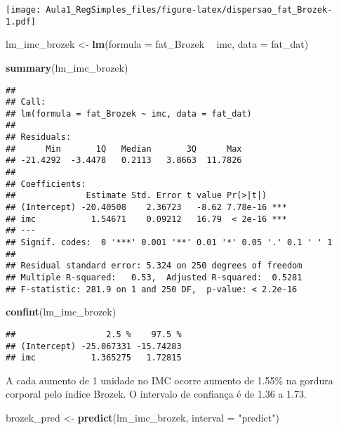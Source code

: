 \documentclass[]{article}
\newenvironment{Shaded}{\begin{snugshade}}{\end{snugshade}}
\newcommand{\DataTypeTok}[1]{\textcolor[rgb]{0.13,0.29,0.53}{#1}}
\newcommand{\KeywordTok}[1]{\textcolor[rgb]{0.13,0.29,0.53}{\textbf{#1}}}
\newcommand{\NormalTok}[1]{#1}
\newcommand{\OperatorTok}[1]{\textcolor[rgb]{0.81,0.36,0.00}{\textbf{#1}}}
\newcommand{\StringTok}[1]{\textcolor[rgb]{0.31,0.60,0.02}{#1}}
\begin{document}
\texttt{[image: Aula1\_RegSimples\_files/figure-latex/dispersao\_fat\_Brozek-1.pdf]}

\begin{Shaded}
\begin{Highlighting}[]
\NormalTok{lm_imc_brozek <-}\StringTok{ }\KeywordTok{lm}\NormalTok{(}\DataTypeTok{formula =}\NormalTok{ fat_Brozek }\OperatorTok{~}\StringTok{ }\NormalTok{imc,}
                    \DataTypeTok{data =}\NormalTok{ fat_dat)}

\KeywordTok{summary}\NormalTok{(lm_imc_brozek)}
\end{Highlighting}
\end{Shaded}

\begin{verbatim}
## 
## Call:
## lm(formula = fat_Brozek ~ imc, data = fat_dat)
## 
## Residuals:
##      Min       1Q   Median       3Q      Max 
## -21.4292  -3.4478   0.2113   3.8663  11.7826 
## 
## Coefficients:
##              Estimate Std. Error t value Pr(>|t|)    
## (Intercept) -20.40508    2.36723   -8.62 7.78e-16 ***
## imc           1.54671    0.09212   16.79  < 2e-16 ***
## ---
## Signif. codes:  0 '***' 0.001 '**' 0.01 '*' 0.05 '.' 0.1 ' ' 1
## 
## Residual standard error: 5.324 on 250 degrees of freedom
## Multiple R-squared:   0.53,  Adjusted R-squared:  0.5281 
## F-statistic: 281.9 on 1 and 250 DF,  p-value: < 2.2e-16
\end{verbatim}

\begin{Shaded}
\begin{Highlighting}[]
\KeywordTok{confint}\NormalTok{(lm_imc_brozek)}
\end{Highlighting}
\end{Shaded}

\begin{verbatim}
##                  2.5 %    97.5 %
## (Intercept) -25.067331 -15.74283
## imc           1.365275   1.72815
\end{verbatim}

A cada aumento de 1 unidade no IMC ocorre aumento de 1.55\% na gordura
corporal pelo índice Brozek. O intervalo de confiança é de 1.36 a 1.73.

\begin{Shaded}
\begin{Highlighting}[]
\NormalTok{brozek_pred <-}\StringTok{ }\KeywordTok{predict}\NormalTok{(lm_imc_brozek, }\DataTypeTok{interval =} \StringTok{"predict"}\NormalTok{)}
\end{Highlighting}
\end{Shaded}
\end{document}
